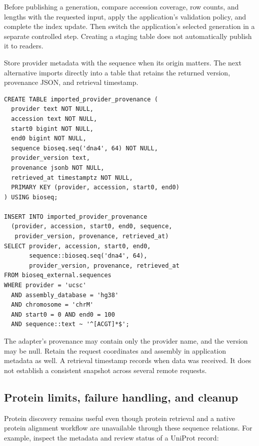 Before publishing a generation, compare accession coverage, row counts, and
lengths with the requested input, apply the application's validation policy,
and complete the index update. Then switch the application's selected
generation in a separate controlled step. Creating a staging table does not
automatically publish it to readers.

Store provider metadata with the sequence when its origin matters. The next
alternative imports directly into a table that retains the returned version,
provenance JSON, and retrieval timestamp.

\par\noindent\begin{minipage}{\linewidth}
\begin{lstlisting}[style=bioseq-appendix-sql]
CREATE TABLE imported_provider_provenance (
  provider text NOT NULL,
  accession text NOT NULL,
  start0 bigint NOT NULL,
  end0 bigint NOT NULL,
  sequence bioseq.seq('dna4', 64) NOT NULL,
  provider_version text,
  provenance jsonb NOT NULL,
  retrieved_at timestamptz NOT NULL,
  PRIMARY KEY (provider, accession, start0, end0)
) USING bioseq;

INSERT INTO imported_provider_provenance
  (provider, accession, start0, end0, sequence,
   provider_version, provenance, retrieved_at)
SELECT provider, accession, start0, end0,
       sequence::bioseq.seq('dna4', 64),
       provider_version, provenance, retrieved_at
FROM bioseq_external.sequences
WHERE provider = 'ucsc'
  AND assembly_database = 'hg38'
  AND chromosome = 'chrM'
  AND start0 = 0 AND end0 = 100
  AND sequence::text ~ '^[ACGT]*$';
\end{lstlisting}
\end{minipage}

The adapter's provenance may contain only the provider name, and the version
may be null. Retain the request coordinates and assembly in application
metadata as well. A retrieval timestamp records when data was received. It
does not establish a consistent snapshot across several remote requests.

\subsection{Protein limits, failure handling, and cleanup}

Protein discovery remains useful even though protein retrieval and a native
protein alignment workflow are unavailable through these sequence relations.
For example, inspect the metadata and review status of a UniProt record:

